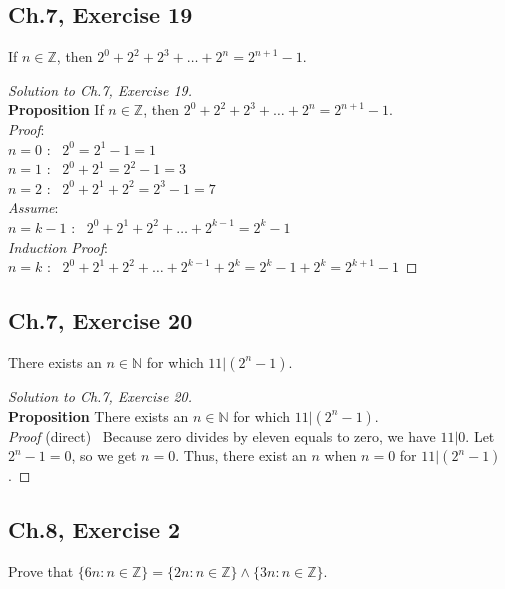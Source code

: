 \documentclass[12pt]{amsart}
\numberwithin{equation}{section}
\theoremstyle{definition}
\theoremstyle{remark}
\begin{document}
\subsection*{Ch.7, Exercise 19}  If $ n \in \mathbb{Z} $, then $ 2^0 + 2^2  + 2^3 + \dots + 2^n = 2^{n+1} - 1 $.


\begin{proof}[Solution to Ch.7, Exercise 19] 
\ \\
\textbf{Proposition} If $ n \in \mathbb{Z} $, then $ 2^0 + 2^2  + 2^3 + \dots + 2^n = 2^{n+1} - 1 $. \\
\textit{Proof}: \\
$ n = 0 $ : \ $ 2^0 = 2^1 - 1 = 1 $ \\
$ n = 1 $ : \ $ 2^0 + 2^1 = 2^2 - 1 = 3 $ \\
$ n = 2 $ : \ $ 2^0 + 2^1 + 2^2 = 2^3 - 1 = 7 $ \\
\textit{Assume}: \\
$ n = k - 1 $ : \ $ 2^0 + 2^1 + 2^2 + \dots + 2^{k - 1} = 2^k - 1 $ \\
\textit{Induction Proof}: \\
$ n = k $ : \ $ 2^0 + 2^1 + 2^2 + \dots + 2^{k - 1} + 2^k = 2^k - 1 + 2^k = 2^{k + 1} - 1 $

\end{proof}




\subsection*{Ch.7, Exercise 20}  There exists an $ n \in \mathbb{N} $ for which $ 11 | (2^n - 1) $.

\begin{proof}[Solution to Ch.7, Exercise 20]
\ \\
\textbf{Proposition} There exists an $ n \in \mathbb{N} $ for which $ 11 | (2^n - 1) $.\\
\textit{Proof} (direct) \ Because zero divides by eleven equals to zero, we have $ 11 | 0 $. Let $ 2^n - 1 = 0 $, so we get $ n = 0 $. Thus, there exist an $ n $ when $ n = 0 $ for $ 11 | (2^n - 1) $.

\end{proof}




\subsection*{Ch.8,  Exercise 2}  Prove that $ \{ 6n : n \in \mathbb{Z} \} = \{ 2n : n \in \mathbb{Z} \} \land \{ 3n : n \in \mathbb{Z} \} $.
\end{document}
